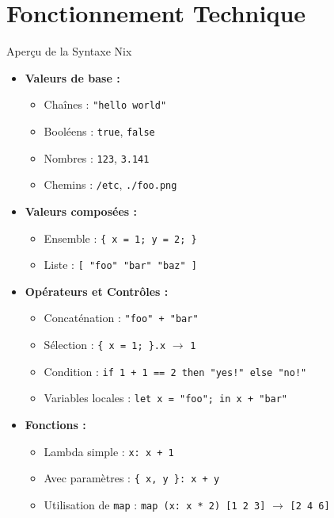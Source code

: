 \documentclass{beamer}
\begin{document}
\section{Fonctionnement Technique}

\begin{frame}[fragile]{Aperçu de la Syntaxe Nix}
    \begin{itemize}
        \item \textbf{Valeurs de base :}
            \begin{itemize}
                \item Chaînes : \lstinline|"hello world"|
                \item Booléens : \lstinline|true|, \lstinline|false|
                \item Nombres : \lstinline|123|, \lstinline|3.141|
                \item Chemins : \lstinline|/etc|, \lstinline|./foo.png|
            \end{itemize}
        \item \textbf{Valeurs composées :}
            \begin{itemize}
                \item Ensemble : \lstinline|{ x = 1; y = 2; }|
                \item Liste : \lstinline|[ "foo" "bar" "baz" ]|
            \end{itemize}
        \item \textbf{Opérateurs et Contrôles :}
            \begin{itemize}
                \item Concaténation : \lstinline|"foo" + "bar"|
                \item Sélection : \lstinline|{ x = 1; }.x| $\rightarrow$ \lstinline|1|
                \item Condition : \lstinline|if 1 + 1 == 2 then "yes!" else "no!"|
                \item Variables locales : \lstinline|let x = "foo"; in x + "bar"|
            \end{itemize}
        \item \textbf{Fonctions :}
            \begin{itemize}
                \item Lambda simple : \lstinline|x: x + 1|
                \item Avec paramètres : \lstinline|{ x, y }: x + y|
                \item Utilisation de \lstinline|map| : \lstinline|map (x: x * 2) [1 2 3]| $\rightarrow$ \lstinline|[2 4 6]|
            \end{itemize}
    \end{itemize}
\end{frame}
\end{document}
